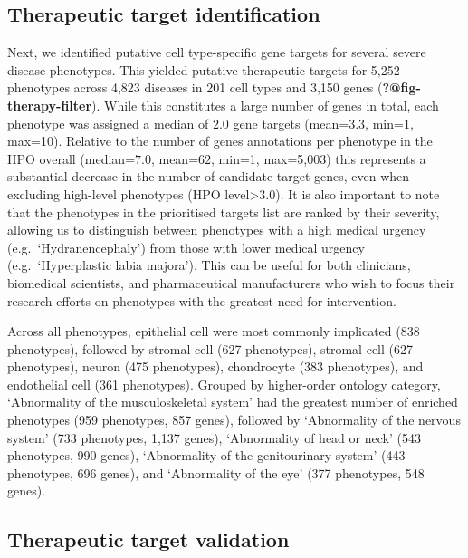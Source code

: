 \documentclass[
]{report}
\begin{document}
\subsection{Therapeutic target
identification}\label{therapeutic-target-identification}

Next, we identified putative cell type-specific gene targets for several
severe disease phenotypes. This yielded putative therapeutic targets for
5,252 phenotypes across 4,823 diseases in 201 cell types and 3,150 genes
(\textbf{?@fig-therapy-filter}). While this constitutes a large number
of genes in total, each phenotype was assigned a median of \(2.0\) gene
targets (mean=\(3.3\), min=1, max=10). Relative to the number of genes
annotations per phenotype in the HPO overall (median=\(7.0\),
mean=\(62\), min=1, max=5,003) this represents a substantial decrease in
the number of candidate target genes, even when excluding high-level
phenotypes (HPO level\textgreater{}\(3.0\)). It is also important to
note that the phenotypes in the prioritised targets list are ranked by
their severity, allowing us to distinguish between phenotypes with a
high medical urgency (e.g.~`Hydranencephaly') from those with lower
medical urgency (e.g.~`Hyperplastic labia majora'). This can be useful
for both clinicians, biomedical scientists, and pharmaceutical
manufacturers who wish to focus their research efforts on phenotypes
with the greatest need for intervention.

Across all phenotypes, epithelial cell were most commonly implicated
(838 phenotypes), followed by stromal cell (627 phenotypes), stromal
cell (627 phenotypes), neuron (475 phenotypes), chondrocyte (383
phenotypes), and endothelial cell (361 phenotypes). Grouped by
higher-order ontology category, `Abnormality of the musculoskeletal
system' had the greatest number of enriched phenotypes (959 phenotypes,
857 genes), followed by `Abnormality of the nervous system' (733
phenotypes, 1,137 genes), `Abnormality of head or neck' (543 phenotypes,
990 genes), `Abnormality of the genitourinary system' (443 phenotypes,
696 genes), and `Abnormality of the eye' (377 phenotypes, 548 genes).

\subsection{Therapeutic target
validation}\label{therapeutic-target-validation}
\end{document}

